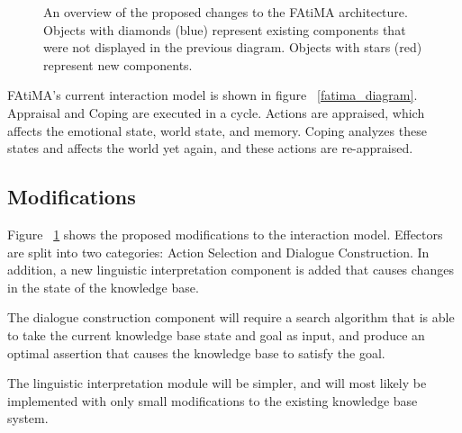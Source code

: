\documentclass{article}
\begin{document}
\begin{figure}[h]
  \caption{An overview of the proposed changes to the FAtiMA architecture.  Objects with diamonds (blue)
  represent existing components that were not displayed in the previous diagram.  Objects with stars (red)
  represent new components.}
  \label{fatima_diagram_modifications}
\end{figure}

FAtiMA's current interaction model is shown in figure ~\ref{fatima_diagram}.
Appraisal and Coping are executed in a cycle.  Actions are appraised, which
affects the emotional state, world state, and memory.  Coping analyzes these
states and affects the world yet again, and these actions are re-appraised.

\subsection{Modifications}

Figure ~\ref{fatima_diagram_modifications} shows the proposed modifications
to the interaction model.  Effectors are split into two categories: Action
Selection and Dialogue Construction.  In addition, a new linguistic interpretation
component is added that causes changes in the state of the knowledge base.

The dialogue construction component will require a search algorithm that is
able to take the current knowledge base state and goal as input, and produce
an optimal assertion that causes the knowledge base to satisfy the goal.

The linguistic interpretation module will be simpler, and will most likely be
implemented with only small modifications to the existing knowledge base system.
\end{document}
